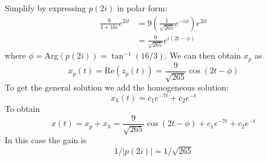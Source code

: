 \documentclass{report}
\begin{document}
Simplify by expressing $p(2i)$ in polar form:
\begin{align*}
\frac{9}{3+16i}e^{2it}&=9\left(\frac{1}{\sqrt{265}}e^{-i\phi}\right)e^{2it}\\
&=\frac{9}{\sqrt{265}}e^{i(2t-\phi)}
\end{align*}
where $\phi=$Arg$(p(2i))=\tan^{-1}(16/3)$. We can then obtain $x_p$ as
\begin{equation*}
x_p(t)=\text{Re}(z_p(t))=\frac{9}{\sqrt{265}}\cos(2t-\phi)
\end{equation*}
To get the general solution we add the homogeneous solution:
\begin{equation*}
x_h(t)=c_1e^{-7t}+c_2e^{-t}
\end{equation*}
To obtain
\begin{equation*}
x(t)=x_p+x_h=\frac{9}{\sqrt{265}}\cos(2t-\phi)+c_1e^{-7t}+c_2e^{-t}
\end{equation*}
In this case the gain is
\begin{equation*}
1/|p(2i)|=1/\sqrt{265}
\end{equation*}
\newpage
\end{document}

